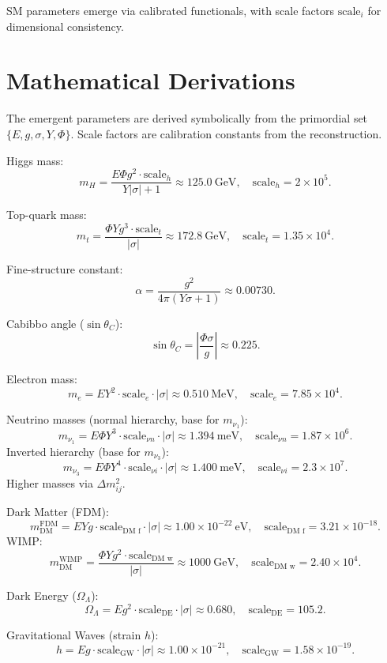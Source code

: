 \documentclass[11pt,a4paper]{article}
\begin{document}
	SM parameters emerge via calibrated functionals, with scale factors $\text{scale}_i$ for dimensional consistency.
	
	\section{Mathematical Derivations}
	The emergent parameters are derived symbolically from the primordial set $\{E, g, \sigma, Y, \Phi\}$. Scale factors are calibration constants from the reconstruction.
	
	Higgs mass:
	\[
	m_H = \frac{E \Phi g^{2} \cdot \text{scale}_h}{Y |\sigma| + 1} \approx 125.0~\text{GeV}, \quad \text{scale}_h = 2 \times 10^5.
	\]
	
	Top-quark mass:
	\[
	m_t = \frac{\Phi Y g^{3} \cdot \text{scale}_t}{|\sigma|} \approx 172.8~\text{GeV}, \quad \text{scale}_t = 1.35 \times 10^4.
	\]
	
	Fine-structure constant:
	\[
	\alpha = \frac{g^{2}}{4 \pi (Y \sigma + 1)} \approx 0.00730.
	\]
	
	Cabibbo angle ($\sin \theta_C$):
	\[
	\sin \theta_C = \left| \frac{\Phi \sigma}{g} \right| \approx 0.225.
	\]
	
	Electron mass:
	\[
	m_e = E Y^{2} \cdot \text{scale}_e \cdot |\sigma| \approx 0.510~\text{MeV}, \quad \text{scale}_e = 7.85 \times 10^4.
	\]
	
	Neutrino masses (normal hierarchy, base for $m_{\nu_1}$):
	\[
	m_{\nu_1} = E \Phi Y^{3} \cdot \text{scale}_{\nu n} \cdot |\sigma| \approx 1.394~\text{meV}, \quad \text{scale}_{\nu n} = 1.87 \times 10^6.
	\]
	Inverted hierarchy (base for $m_{\nu_3}$):
	\[
	m_{\nu_3} = E \Phi Y^{4} \cdot \text{scale}_{\nu i} \cdot |\sigma| \approx 1.400~\text{meV}, \quad \text{scale}_{\nu i} = 2.3 \times 10^7.
	\]
	Higher masses via $\Delta m^2_{ij}$.
	
	Dark Matter (FDM):
	\[
	m_{\text{DM}}^{\text{FDM}} = E Y g \cdot \text{scale}_{\text{DM f}} \cdot |\sigma| \approx 1.00 \times 10^{-22}~\text{eV}, \quad \text{scale}_{\text{DM f}} = 3.21 \times 10^{-18}.
	\]
	WIMP:
	\[
	m_{\text{DM}}^{\text{WIMP}} = \frac{\Phi Y g^{2} \cdot \text{scale}_{\text{DM w}}}{|\sigma|} \approx 1000~\text{GeV}, \quad \text{scale}_{\text{DM w}} = 2.40 \times 10^4.
	\]
	
	Dark Energy ($\Omega_\Lambda$):
	\[
	\Omega_\Lambda = E g^{2} \cdot \text{scale}_{\text{DE}} \cdot |\sigma| \approx 0.680, \quad \text{scale}_{\text{DE}} = 105.2.
	\]
	
	Gravitational Waves (strain $h$):
	\[
	h = E g \cdot \text{scale}_{\text{GW}} \cdot |\sigma| \approx 1.00 \times 10^{-21}, \quad \text{scale}_{\text{GW}} = 1.58 \times 10^{-19}.
	\]
	
\end{document}
